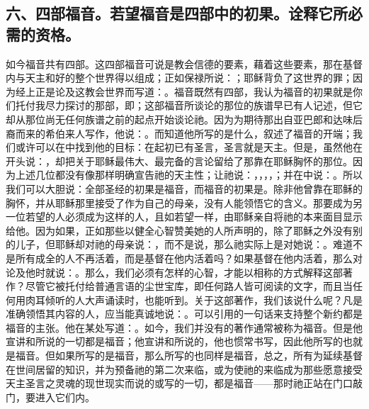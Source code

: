 \subsection{六、四部福音。若望福音是四部中的初果。诠释它所必需的资格。}

如今福音共有四部。这四部福音可说是教会信德的要素，藉着这些要素，那在基督内与天主和好的整个世界得以组成；正如保禄所说：；耶稣背负了这世界的罪；因为经上正是论及这教会世界而写道：。福音既然有四部，我认为福音的初果就是你们托付我尽力探讨的那部，即；这部福音所谈论的那位的族谱早已有人记述，但它却从那位尚无任何族谱之前的起点开始谈论祂。因为为期待那出自亚巴郎和达味后裔而来的希伯来人写作，他说：。而知道他所写的是什么，叙述了福音的开端；我们或许可以在中找到他的目标：在起初已有圣言，圣言就是天主。但是，虽然他在开头说：，却把关于耶稣最伟大、最完备的言论留给了那靠在耶稣胸怀的那位。因为上述几位都没有像那样明确宣告祂的天主性；让祂说：，，，，；并在中说：。所以我们可以大胆说：全部圣经的初果是福音，而福音的初果是。除非他曾靠在耶稣的胸怀，并从耶稣那里接受了作为自己的母亲，没有人能领悟它的含义。那要成为另一位若望的人必须成为这样的人，且如若望一样，由耶稣亲自将祂的本来面目显示给他。因为如果，正如那些以健全心智赞美她的人所声明的，除了耶稣之外没有别的儿子，但耶稣却对祂的母亲说：，而不是说，那么祂实际上是对她说：。难道不是所有成全的人不再活着，而是基督在他内活着吗？如果基督在他内活着，那么对论及他时就说：。那么，我们必须有怎样的心智，才能以相称的方式解释这部著作？尽管它被托付给普通言语的尘世宝库，即任何路人皆可阅读的文字，而且当任何用肉耳倾听的人大声诵读时，也能听到。关于这部著作，我们该说什么呢？凡是准确领悟其内容的人，应当能真诚地说：。可以引用的一句话来支持整个新约都是福音的主张。他在某处写道：。如今，我们并没有的著作通常被称为福音。但是他宣讲和所说的一切都是福音；他宣讲和所说的，他也惯常书写，因此他所写的也就是福音。但如果所写的是福音，那么所写的也同样是福音，总之，所有为延续基督在世间居留的知识，并为预备祂的第二次来临，或为使祂的来临成为那些愿意接受天主圣言之灵魂的现世现实而说的或写的一切，都是福音——那时祂正站在门口敲门，要进入它们内。\par

